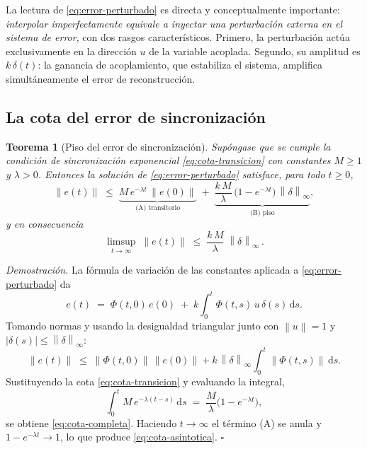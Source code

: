 \documentclass[12pt,a4paper]{article}
\newtheorem{teorema}{Teorema}[section]
\newenvironment{proof}[1][Demostración]%
  {\par\medskip\noindent\textit{#1.}\space\ignorespaces}%
  {\hfill$\square$\par\medskip}
\newcommand{\dnorm}[1]{\left\lVert #1 \right\rVert}
\newcommand{\infnorm}[1]{\dnorm{#1}_{\infty}}
\begin{document}
La lectura de \eqref{eq:error-perturbado} es directa y conceptualmente importante:
\emph{interpolar imperfectamente equivale a inyectar una perturbación externa en el
sistema de error}, con dos rasgos característicos. Primero, la perturbación actúa
exclusivamente en la dirección $u$ de la variable acoplada. Segundo, su amplitud es
$k\,\delta(t)$: la ganancia de acoplamiento, que estabiliza el sistema, amplifica
simultáneamente el error de reconstrucción.

\subsection{La cota del error de sincronización}

\begin{teorema}[Piso del error de sincronización]
\label{th:principal}
Supóngase que se cumple la condición de sincronización exponencial
\eqref{eq:cota-transicion} con constantes $M\ge 1$ y $\lambda>0$. Entonces la
solución de \eqref{eq:error-perturbado} satisface, para todo $t\ge 0$,
\begin{equation}
\label{eq:cota-completa}
  \dnorm{e(t)}
  \;\le\;
  \underbrace{M\,e^{-\lambda t}\,\dnorm{e(0)}}_{\text{(A) transitorio}}
  \;+\;
  \underbrace{\frac{k\,M}{\lambda}\,\bigl(1-e^{-\lambda t}\bigr)\,\infnorm{\delta}}_{\text{(B) piso}} ,
\end{equation}
y en consecuencia
\begin{equation}
\label{eq:cota-asintotica}
  \limsup_{t\to\infty}\;\dnorm{e(t)}
  \;\le\;
  \frac{k\,M}{\lambda}\;\infnorm{\delta}\, .
\end{equation}
\end{teorema}

\begin{proof}
La fórmula de variación de las constantes aplicada a
\eqref{eq:error-perturbado} da
\[
  e(t) \;=\; \Phi(t,0)\,e(0) \;+\; k\int_{0}^{t} \Phi(t,s)\,u\,\delta(s)\,\mathrm{d}s .
\]
Tomando normas y usando la desigualdad triangular junto con
$\dnorm{u}=1$ y $\lvert\delta(s)\rvert \le \infnorm{\delta}$:
\[
  \dnorm{e(t)}
  \;\le\; \dnorm{\Phi(t,0)}\,\dnorm{e(0)}
        + k\,\infnorm{\delta}\int_{0}^{t}\dnorm{\Phi(t,s)}\,\mathrm{d}s .
\]
Sustituyendo la cota \eqref{eq:cota-transicion} y evaluando la integral,
\[
  \int_{0}^{t} M\,e^{-\lambda(t-s)}\,\mathrm{d}s
  \;=\; \frac{M}{\lambda}\bigl(1-e^{-\lambda t}\bigr),
\]
se obtiene \eqref{eq:cota-completa}. Haciendo $t\to\infty$ el término (A) se anula
y $1-e^{-\lambda t}\to 1$, lo que produce \eqref{eq:cota-asintotica}.
\end{proof}
\end{document}
